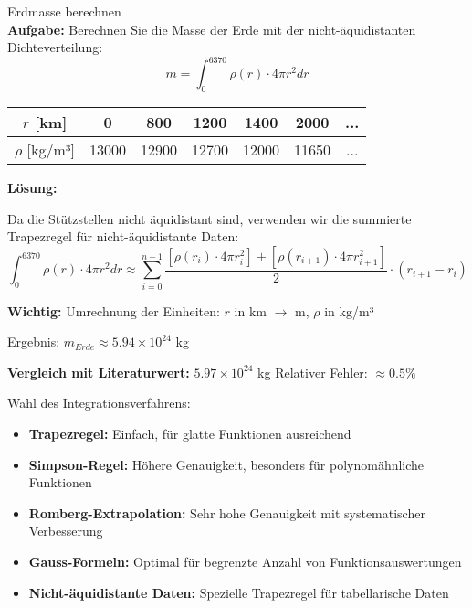 \begin{example2}{Erdmasse berechnen}\\
\textbf{Aufgabe:} Berechnen Sie die Masse der Erde mit der nicht-äquidistanten Dichteverteilung:
$$m = \int_0^{6370} \rho(r) \cdot 4\pi r^2 dr$$

\begin{center}
\begin{tabular}{|c|c|c|c|c|c|c|}
\hline
$r$ [km] & 0 & 800 & 1200 & 1400 & 2000 & ... \\
\hline
$\rho$ [kg/m³] & 13000 & 12900 & 12700 & 12000 & 11650 & ... \\
\hline
\end{tabular}
\end{center}
\tcblower
\textbf{Lösung:}

Da die Stützstellen nicht äquidistant sind, verwenden wir die summierte Trapezregel für nicht-äquidistante Daten:
$$\int_0^{6370} \rho(r) \cdot 4\pi r^2 dr \approx \sum_{i=0}^{n-1} \frac{[\rho(r_i) \cdot 4\pi r_i^2] + [\rho(r_{i+1}) \cdot 4\pi r_{i+1}^2]}{2} \cdot (r_{i+1} - r_i)$$

\textbf{Wichtig:} Umrechnung der Einheiten: $r$ in km $\rightarrow$ m, $\rho$ in kg/m³

Ergebnis: $m_{Erde} \approx 5.94 \times 10^{24}$ kg

\textbf{Vergleich mit Literaturwert:} $5.97 \times 10^{24}$ kg
Relativer Fehler: $\approx 0.5\%$
\end{example2}

\begin{KR}{Wahl des Integrationsverfahrens:}
\begin{itemize}
    \item \textbf{Trapezregel:} Einfach, für glatte Funktionen ausreichend
    \item \textbf{Simpson-Regel:} Höhere Genauigkeit, besonders für polynomähnliche Funktionen
    \item \textbf{Romberg-Extrapolation:} Sehr hohe Genauigkeit mit systematischer Verbesserung
    \item \textbf{Gauss-Formeln:} Optimal für begrenzte Anzahl von Funktionsauswertungen
    \item \textbf{Nicht-äquidistante Daten:} Spezielle Trapezregel für tabellarische Daten
\end{itemize}
\end{KR}

